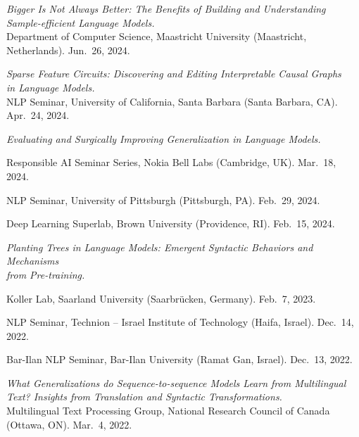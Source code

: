 \documentclass[10pt]{article}
\newcommand{\halfblankline}{\quad\vspace{-0.5\baselineskip}\pagebreak[3]}
\begin{document}
	\halfblankline
	
	\emph{Bigger Is Not Always Better: The Benefits of Building and Understanding\\Sample-efficient Language Models.}\\Department of Computer Science, Maastricht University (Maastricht, Netherlands). Jun.\ 26, 2024.
	
	\halfblankline

	\emph{Sparse Feature Circuits: Discovering and Editing Interpretable Causal Graphs\\in Language Models.}\\NLP Seminar, University of California, Santa Barbara (Santa Barbara, CA). Apr.\ 24, 2024.

	\halfblankline

	\emph{Evaluating and Surgically Improving Generalization in Language Models.}
	\begin{innerlist}
	\item Responsible AI Seminar Series, Nokia Bell Labs (Cambridge, UK). Mar.\ 18, 2024.
	\item NLP Seminar, University of Pittsburgh (Pittsburgh, PA). Feb.\ 29, 2024.
	\item Deep Learning Superlab, Brown University (Providence, RI). Feb.\ 15, 2024.
	\end{innerlist}

	\halfblankline

	\emph{Planting Trees in Language Models: Emergent Syntactic Behaviors and Mechanisms\\from Pre-training.}
	\begin{innerlist}
	\item Koller Lab, Saarland University (Saarbrücken, Germany). Feb.\ 7, 2023.
	\item NLP Seminar, Technion -- Israel Institute of Technology (Haifa, Israel). Dec.\ 14, 2022.
	\item Bar-Ilan NLP Seminar, Bar-Ilan University (Ramat Gan, Israel). Dec.\ 13, 2022.
	\end{innerlist}

	\halfblankline

	\emph{What Generalizations do Sequence-to-sequence Models Learn from Multilingual Text? Insights from Translation and Syntactic Transformations.}\\Multilingual Text Processing Group, National Research Council of Canada (Ottawa, ON). Mar.\ 4, 2022.
	
	\halfblankline
\end{document}
